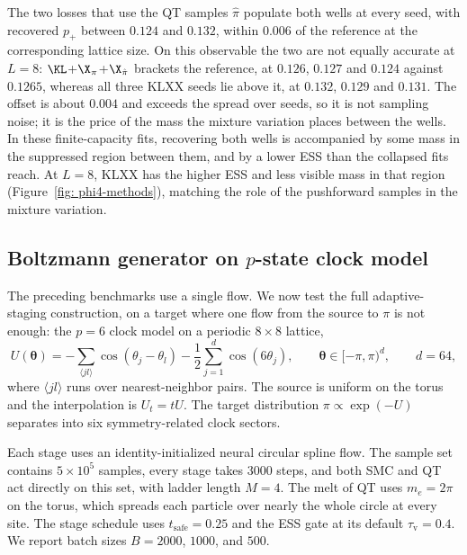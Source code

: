 \documentclass{article}
\begin{document}
The two losses that use the QT samples $\hat\pi$ populate both wells at every seed, with recovered $p_+$ between $0.124$ and $0.132$, within $0.006$ of the reference at the corresponding lattice size. On this observable the two are not equally accurate at $L=8$: $\KL$+$\X_\pi$+$\X_{\hat\pi}$ brackets the reference, at $0.126$, $0.127$ and $0.124$ against $0.1265$, whereas all three KLXX seeds lie above it, at $0.132$, $0.129$ and $0.131$. The offset is about $0.004$ and exceeds the spread over seeds, so it is not sampling noise; it is the price of the mass the mixture variation places between the wells. In these finite-capacity fits, recovering both wells is accompanied by some mass in the suppressed region between them, and by a lower ESS than the collapsed fits reach. At $L=8$, KLXX has the higher ESS and less visible mass in that region (Figure~\ref{fig: phi4-methods}), matching the role of the pushforward samples in the mixture variation.

\subsection{Boltzmann generator on \texorpdfstring{$p$}{p}-state clock model}
\label{subsec: clock}

The preceding benchmarks use a single flow. We now test the full adaptive-staging construction, on a target where one flow from the source to $\pi$ is not enough: the $p=6$ clock model on a periodic $8\times8$ lattice,
\begin{equation}
U(\boldsymbol\theta)
=-\sum_{\langle jl\rangle}\cos(\theta_j-\theta_l)
-\frac12\sum_{j=1}^{d}\cos(6\theta_j),
\qquad \boldsymbol\theta\in[-\pi,\pi)^{d},\qquad d=64,
\label{eq: clock-potential}
\end{equation}
where $\langle jl\rangle$ runs over nearest-neighbor pairs. The source is uniform on the torus and the interpolation is $U_t=tU$. The target distribution $\pi\propto\exp(-U)$ separates into six symmetry-related clock sectors.

Each stage uses an identity-initialized neural circular spline flow. The sample set contains $5\times10^5$ samples, every stage takes $3000$ steps, and both SMC and QT act directly on this set, with ladder length $M=4$. The melt of QT uses $m_e=2\pi$ on the torus, which spreads each particle over nearly the whole circle at every site. The stage schedule uses $t_{\mathrm{safe}}=0.25$ and the ESS gate at its default $\tau_{\mathrm v}=0.4$. We report batch sizes $B=2000$, $1000$, and $500$.
\end{document}
